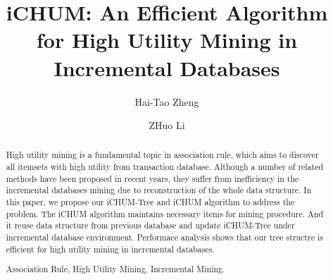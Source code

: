 \documentclass[runningheads,a4paper]{llncs}
\newcommand{\keywords}[1]{\par\addvspace\baselineskip
\noindent\keywordname\enspace\ignorespaces#1}
\begin{document}
\mainmatter %

\title{iCHUM: An Efficient Algorithm for High Utility Mining in Incremental Databases}


%
%
\author{Hai-Tao Zheng%
\and ZHuo Li}
%



%
%

\maketitle


\begin{abstract}
High utility mining is a fundamental topic in association rule, which aims to discover all itemsets with high utility from transaction database. Although a number of related methods have been proposed in recent years, they suffer from inefficiency in the incremental databases mining due to reconstruction of the whole data structure. In this paper, we propose our iCHUM-Tree and iCHUM algorithm to address the problem. The iCHUM algorithm maintains necessary items for mining procedure. And it reuse data structure from previous database and update iCHUM-Tree under incremental database environment. Performace analysis shows that our tree structre is efficient for high utility mining in incremental databases.
\keywords{Association Rule, High Utility Mining, Incremental Mining.}
\end{abstract}
\end{document}
